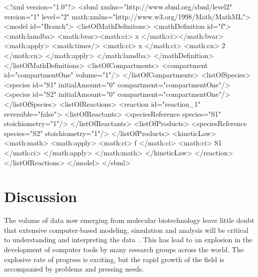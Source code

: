 \documentclass[10pt]{cekarticle}
\begin{document}
\begin{example}
<?xml version="1.0"?>
<sbml xmlns="http://www.sbml.org/sbml/level2" version="1" level="2"
      math:xmlns="http://www.w3.org/1998/Math/MathML">
    <model id="Branch">
        <listOfMathDefinitons>
            <mathDefinition id="f">
                <math:lamdba>
                    <math:bvar><math:ci> x </math:ci></math:bvar>
                    <math:apply>
                        <math:times/>
                        <math:ci> x </math:ci>
                        <math:cn> 2 </math:cn>
                    </math:apply>
                </math:lamdba>
            </mathDefinition>
        </listOfMathDefinitions>
        <listOfCompartments>
            <compartment id="compartmentOne" volume="1"/>
        </listOfCompartments>
        <listOfSpecies>
            <species id="S1" initialAmount="0" compartment="compartmentOne"/>
            <species id="S2" initialAmount="0" compartment="compartmentOne"/>
        </listOfSpecies>
        <listOfReactions>
            <reaction id="reaction_1" reversible="false">
                <listOfReactants>
                    <speciesReference species="S1" stoichiometry="1"/>
                </listOfReactants>
                <listOfProducts>
                    <speciesReference species="S2" stoichiometry="1"/>
                </listOfProducts>
                <kineticLaw>
                    <math:math>
                        <math:apply>
                            <math:ci> f </math:ci>
                            <math:ci> S1 </math:ci>
                         </math:apply>
                    </math:math>
                </kineticLaw>
            </reaction>
        </listOfReactions>
    </model>
</sbml>
\end{example}

\section{Discussion}
\label{sec:discussion}

The volume of data now emerging from molecular biotechnology
leave little doubt that extensive computer-based modeling, simulation and
analysis will be critical to understanding and interpreting the
data~\citep{abbott:1999,gilman:2000,popel:1998,smaglik:2000}.  This
has lead to an explosion in the development of computer tools by many
research groups across the world.  The explosive rate of progress is
exciting, but the rapid growth of the field is accompanied by problems and
pressing needs.
\end{document}
